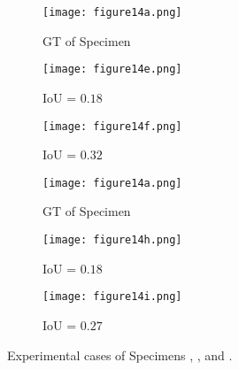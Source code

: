 \begin{sloppypar}
\begin{figure} [!ht]
		\begin{subfigure}[b]{0.32\textwidth}
			\centering
			\texttt{[image: figure14a.png]}
			\caption{GT of Specimen~}
			\label{fig:gt_specimen_3}
		\end{subfigure}
		\hfill
		\begin{subfigure}[b]{0.32\textwidth}
			\centering
			\texttt{[image: figure14e.png]}
			\caption{IoU = \(0.18\)} 
			\label{fig:L3_S3_B_saeed}
		\end{subfigure}
		\hfill
		\begin{subfigure}[b]{0.32\textwidth}
			\centering
			\texttt{[image: figure14f.png]}
			\caption{IoU = \(0.32\)} 
			\label{fig:L3_S3_B_ijjeh}
		\end{subfigure}
		\par\medskip
		\begin{subfigure}[b]{0.32\textwidth}
			\centering
			\texttt{[image: figure14a.png]}
			\caption{GT of Specimen~}
			\label{fig:gt_specimen_4}
		\end{subfigure}
		\hfill
		\begin{subfigure}[b]{0.32\textwidth}
			\centering
			\texttt{[image: figure14h.png]}
			\caption{IoU = \(0.18\)}  
			\label{fig:L3_S4_B_saeed}
		\end{subfigure}
		\hfill
		\begin{subfigure}[b]{0.32\textwidth}
			\centering
			\texttt{[image: figure14i.png]}
			\caption{IoU = \(0.27\)} 
			\label{fig:L3_S4_B_ijjeh}
		\end{subfigure}
		\caption{Experimental cases of Specimens , , and .}
		\label{fig:exp_case}
	\end{figure} 
	

\end{sloppypar}
